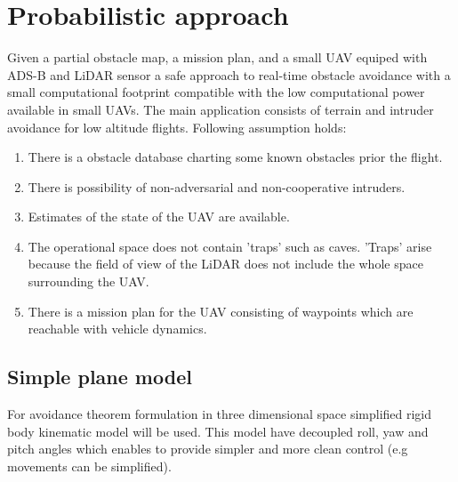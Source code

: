 \chapter{Probabilistic approach}\label{ch:04ProblemFormulation}
\noindent
Given a partial obstacle map, a mission plan, and a small UAV equiped with ADS-B and LiDAR sensor a safe approach to real-time obstacle avoidance with a small computational footprint compatible with the low computational power available in small UAVs. The main application consists of terrain and intruder avoidance for low altitude flights. Following assumption holds:
\begin{enumerate}
  \item There is a obstacle database charting some known obstacles prior the flight.
  \item There is possibility of non-adversarial and non-cooperative intruders.
  \item Estimates of the state of the UAV are available.
  \item The operational space does not contain 'traps' such as caves. 'Traps' arise because the field of view of the LiDAR does not include the whole space surrounding the UAV.
  \item There is a mission plan for the UAV consisting of waypoints which are reachable with vehicle dynamics.
\end{enumerate}
\noindent

\section{Simple plane model}\label{sec:3DsimplisticplaneModel}
\noindent For avoidance theorem formulation in three dimensional space simplified rigid body kinematic model will be used. This model have decoupled roll, yaw and pitch angles which enables to provide simpler and more clean control (e.g movements can be simplified). 

